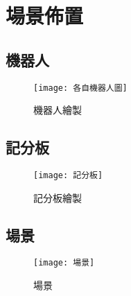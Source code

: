 \chapter{場景佈置}
\section{機器人}
\begin{figure}[hbt!]
\begin{center}
\label{各自機器人圖}
\texttt{[image: 各自機器人圖]}
\caption{\Large 機器人繪製}
\end{center}
\end{figure}
\newpage

\section{記分板}
\begin{figure}[hbt!]
\begin{center}
\label{記分板}
\texttt{[image: 記分板]}
\caption{\Large 記分板繪製}
\end{center}
\end{figure}
\newpage

\section{場景}
\begin{figure}[hbt!]
\begin{center}
\label{場景}
\texttt{[image: 場景]}
\caption{\Large 場景}
\end{center}
\end{figure}
\newpage
